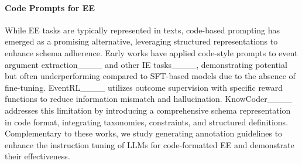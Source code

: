 \paragraph{Code Prompts for EE} 
While EE tasks are typically represented in texts, code-based prompting has emerged as a promising alternative, leveraging structured representations to enhance schema adherence. Early works have applied code-style prompts to event argument extraction____ and other IE tasks____, demonstrating potential but often underperforming compared to SFT-based models due to the absence of fine-tuning. EventRL____ utilizes outcome supervision with specific reward functions to reduce information mismatch and hallucination. KnowCoder____ addresses this limitation by introducing a comprehensive schema representation in code format, integrating taxonomies, constraints, and structured definitions. 
Complementary to these works, we study generating annotation guidelines to enhance the instruction tuning of LLMs for code-formatted EE and demonstrate their effectiveness.
